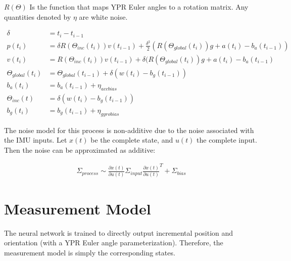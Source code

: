 \documentclass[]{article}
\begin{document}
$R(\Theta)$ Is the function that maps YPR Euler angles to a rotation matrix. Any quantities denoted by $\eta$ are white noise.

\begin{align}
\delta &= t_i - t_{i-1} \\
p(t_i) &= \delta R(\Theta_{inc}(t_i)) v(t_{i-1}) + \frac{\delta^2}{2}(R(\Theta_{global}(t_i))g + a(t_i) - b_a(t_{i-1})) \\
v(t_i) &= R(\Theta_{inc}(t_i)) v(t_{i-1}) + \delta(R(\Theta_{global}(t_i))g + a(t_i) - b_a(t_{i-1}) \\
\Theta_{global}(t_i) &= \Theta_{global}(t_{i-1}) + \delta(w(t_i) - b_g(t_{i-1})) \\
b_a(t_i) &= b_a(t_{i - 1}) + \eta_{accbias} \\
\Theta_{inc}(t) &= \delta (w(t_i) - b_g(t_{i-1})) \\
b_g(t_i) &= b_g(t_{i-1}) + \eta_{gyrobias}
\end{align}

The noise model for this process is non-additive due to the noise associated with the IMU inputs. Let $x(t)$ be the complete state, and $u(t)$ the complete input. Then the noise can be approximated as additive:

\begin{align}
\Sigma_{process} \sim \frac{\partial x(t)}{\partial u(t)} \Sigma_{input} \frac{\partial x(t)}{\partial u(t)}^T + \Sigma_{bias}
\end{align}

\section{Measurement Model}

The neural network is trained to directly output incremental position and orientation (with a YPR Euler angle parameterization). Therefore, the measurement model is simply the corresponding states.
\end{document}
